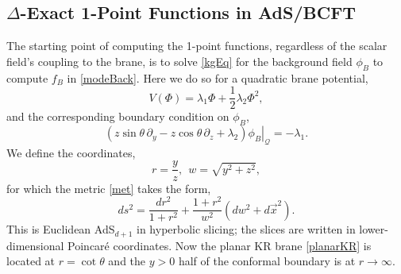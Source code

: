 \documentclass[reprint,amsmath,amssymb,aps,nofootinbib,twocolumn]{revtex4-2}
\begin{document}
\begin{appendix}




\section{$\Delta$-Exact 1-Point Functions in AdS/BCFT}\label{appB}

The starting point of computing the 1-point functions, regardless of the scalar field's coupling to the brane, is to solve \eqref{kgEq} for the background field $\phi_B$ to compute $f_B$ in \eqref{modeBack}. Here we do so for a quadratic brane potential,
\begin{equation}
V(\Phi) = \lambda_1 \Phi + \frac{1}{2}\lambda_2 \Phi^2,
\end{equation}
and the corresponding boundary condition on $\phi_B$,
\begin{equation}
\left.\left(z\sin{\theta}\,\partial_y - z\cos{\theta}\, \partial_z + \lambda_2\right)\phi_B\right|_{\mathcal{Q}} = -\lambda_1.
\end{equation}
We define the coordinates,
\begin{equation}
r = \frac{y}{z},\ \ w = \sqrt{y^2 + z^2},
\label{btzslicing}
\end{equation}
for which the metric \eqref{met} takes the form,
\begin{equation}
ds^2 = \frac{dr^2}{1+r^2} + \frac{1+r^2}{w^2}(dw^2 + d\vec{x}^2).
\end{equation}
This is Euclidean AdS$_{d+1}$ in hyperbolic slicing; the slices are written in lower-dimensional Poincar\'e coordinates. Now the planar KR brane \eqref{planarKR} is located at $r = \cot\theta$ and the $y > 0$ half of the conformal boundary is at $r \to \infty$.


\end{appendix}
\end{document}
